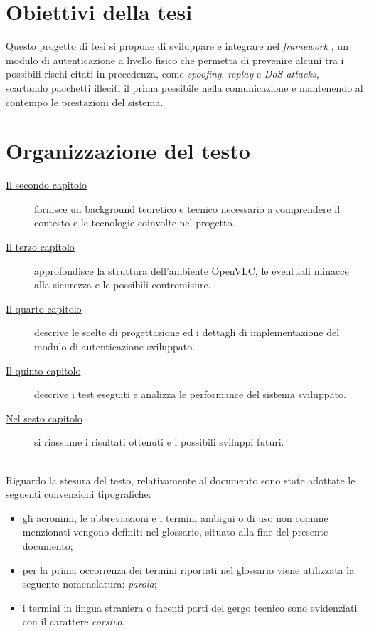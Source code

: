 \section{Obiettivi della tesi}

Questo progetto di tesi si propone di sviluppare e integrare nel \textit{framework} \cite{site:openvlc}, un modulo di autenticazione a livello fisico che permetta di prevenire alcuni tra i possibili rischi citati in precedenza, come \textit{spoofing}, \textit{replay} e \textit{DoS attacks}, scartando pacchetti illeciti il prima possibile nella comunicazione e mantenendo al contempo le prestazioni del sistema.

\section{Organizzazione del testo}

\begin{description}
    \item[{\hyperref[cap:background]{Il secondo capitolo}}] fornisce un background teoretico e tecnico necessario a comprendere il contesto e le tecnologie coinvolte nel progetto. 
    
    \item[{\hyperref[cap:analisi]{Il terzo capitolo}}] approfondisce la struttura dell'ambiente OpenVLC, le eventuali minacce alla sicurezza e le possibili contromisure.
    
    \item[{\hyperref[cap:progettazione]{Il quarto capitolo}}] descrive le scelte di progettazione ed i dettagli di implementazione del modulo di autenticazione sviluppato.
    
    \item[{\hyperref[cap:test]{Il quinto capitolo}}] descrive i test eseguiti e analizza le performance del sistema sviluppato.
        
    \item[{\hyperref[cap:conclusioni]{Nel sesto capitolo}}] si riassume i risultati ottenuti e i possibili sviluppi futuri.
\end{description}

\noindent \\Riguardo la stesura del testo, relativamente al documento sono state adottate le seguenti convenzioni tipografiche:
\begin{itemize}
	\item gli acronimi, le abbreviazioni e i termini ambigui o di uso non comune menzionati vengono definiti nel glossario, situato alla fine del presente documento;
	\item per la prima occorrenza dei termini riportati nel glossario viene utilizzata la seguente nomenclatura: \emph{parola}\glsfirstoccur;
	\item i termini in lingua straniera o facenti parti del gergo tecnico sono evidenziati con il carattere \emph{corsivo}.
\end{itemize}